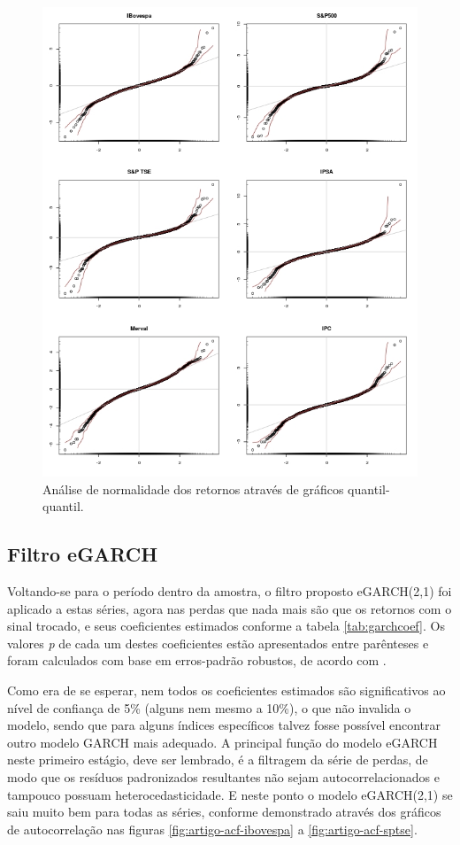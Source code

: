 \documentclass[1p]{elsarticle}
\theoremstyle{definition}
\begin{document}
\begin{figure}[H]
	\centering
	\includegraphics[width=1\linewidth]{figs/artigo-qqplots}
	\caption{Análise de normalidade dos retornos através de gráficos quantil-quantil.}
	\label{fig:artigo-qqplots}
\end{figure}

\subsection{Filtro eGARCH}
\label{sec:filtro}

Voltando-se para o período dentro da amostra, o filtro proposto eGARCH(2,1) foi aplicado a estas séries, agora nas perdas que nada mais são que os retornos com o sinal trocado, e seus coeficientes estimados conforme a tabela \ref{tab:garchcoef}. Os valores \emph{p} de cada um destes coeficientes estão apresentados entre parênteses e foram calculados com base em erros-padrão robustos, de acordo com \cite{White1982}.

Como era de se esperar, nem todos os coeficientes estimados são significativos ao nível de confiança de 5\% (alguns nem mesmo a 10\%), o que não invalida o modelo, sendo que para alguns índices específicos talvez fosse possível encontrar outro modelo GARCH mais adequado. A principal função do modelo eGARCH neste primeiro estágio, deve ser lembrado, é a filtragem da série de perdas, de modo que os resíduos padronizados resultantes não sejam autocorrelacionados e tampouco possuam heterocedasticidade. E neste ponto o modelo eGARCH(2,1) se saiu muito bem para todas as séries, conforme demonstrado através dos gráficos de autocorrelação nas figuras \ref{fig:artigo-acf-ibovespa} a \ref{fig:artigo-acf-sptse}.
\end{document}
